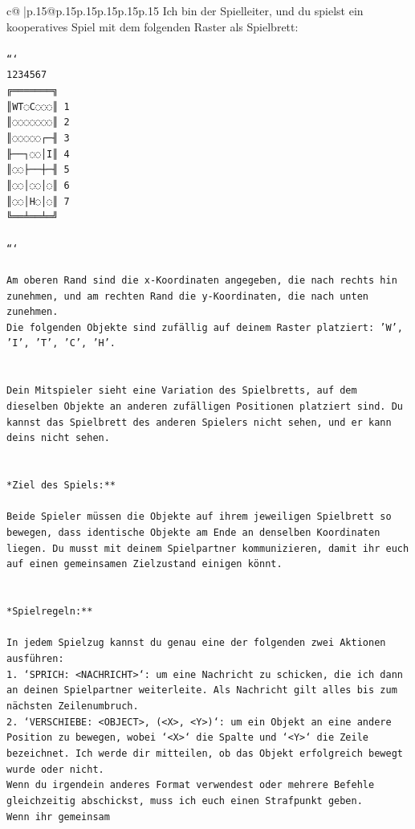 \documentclass{article}
\begin{document}
{\begin{supertabular}{c@{$\;$}|p{.15\linewidth}@{}p{.15\linewidth}p{.15\linewidth}p{.15\linewidth}p{.15\linewidth}p{.15\linewidth}}
{{{	 Ich bin der Spielleiter, und du spielst ein kooperatives Spiel mit dem folgenden Raster als Spielbrett:\\ \tt \\ \tt ```\\ \tt  1234567\\ \tt ╔═══════╗\\ \tt ║WT◌C◌◌◌║ 1\\ \tt ║◌◌◌◌◌◌◌║ 2\\ \tt ║◌◌◌◌◌┌─╢ 3\\ \tt ╟──┐◌◌│I║ 4\\ \tt ║◌◌├──┼─╢ 5\\ \tt ║◌◌│◌◌│◌║ 6\\ \tt ║◌◌│H◌│◌║ 7\\ \tt ╚══╧══╧═╝\\ \tt \\ \tt ```\\ \tt \\ \tt * Am oberen Rand sind die x-Koordinaten angegeben, die nach rechts hin zunehmen, und am rechten Rand die y-Koordinaten, die nach unten zunehmen.\\ \tt * Die folgenden Objekte sind zufällig auf deinem Raster platziert: 'W', 'I', 'T', 'C', 'H'.\\ \tt \\ \tt \\ \tt Dein Mitspieler sieht eine Variation des Spielbretts, auf dem dieselben Objekte an anderen zufälligen Positionen platziert sind. Du kannst das Spielbrett des anderen Spielers nicht sehen, und er kann deins nicht sehen.\\ \tt \\ \tt \\ \tt **Ziel des Spiels:**\\ \tt \\ \tt Beide Spieler müssen die Objekte auf ihrem jeweiligen Spielbrett so bewegen, dass identische Objekte am Ende an denselben Koordinaten liegen. Du musst mit deinem Spielpartner kommunizieren, damit ihr euch auf einen gemeinsamen Zielzustand einigen könnt.\\ \tt \\ \tt \\ \tt **Spielregeln:**\\ \tt \\ \tt * In jedem Spielzug kannst du genau eine der folgenden zwei Aktionen ausführen:\\ \tt 1. `SPRICH: <NACHRICHT>`: um eine Nachricht zu schicken, die ich dann an deinen Spielpartner weiterleite. Als Nachricht gilt alles bis zum nächsten Zeilenumbruch.\\ \tt 2. `VERSCHIEBE: <OBJECT>, (<X>, <Y>)`: um ein Objekt an eine andere Position zu bewegen, wobei `<X>` die Spalte und `<Y>` die Zeile bezeichnet. Ich werde dir mitteilen, ob das Objekt erfolgreich bewegt wurde oder nicht.\\ \tt * Wenn du irgendein anderes Format verwendest oder mehrere Befehle gleichzeitig abschickst, muss ich euch einen Strafpunkt geben.\\ \tt * Wenn ihr gemeinsam }}}
\end{supertabular}}
\end{document}
